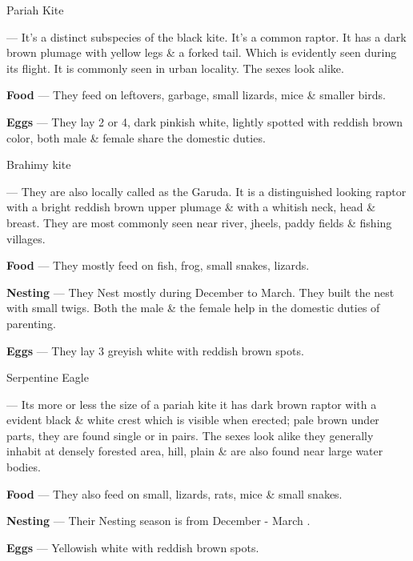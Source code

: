 \begin{bird}{Pariah Kite}

 --- It's a distinct subspecies of the black kite. It's a common raptor. It has a dark brown plumage with yellow legs \& a forked tail. Which is evidently seen during its flight. It is commonly seen in urban locality. The sexes look alike.

{\large\bf Food} --- They feed on leftovers, garbage, small lizards, mice \& smaller birds. 

{\large\bf Eggs} --- They lay 2 or 4, dark pinkish white, lightly spotted with reddish brown color, both male \& female share the domestic duties.
\end{bird}

\begin{bird}{Brahimy kite}

 --- They are also locally called as the Garuda. It is a distinguished looking raptor with a bright reddish brown upper plumage \& with a whitish neck, head \& breast. They  are most commonly seen near river, jheels, paddy fields \& fishing villages.

{\large\bf Food} --- They mostly feed on fish, frog, small snakes, lizards. 

{\large\bf Nesting} --- They Nest mostly during December to March. They built the nest with small twigs. Both  the male \& the female help in the domestic duties of parenting. 

{\large\bf Eggs} --- They lay 3 greyish white with reddish brown spots.
\end{bird}

\newpage

\begin{bird}{Serpentine Eagle}

 --- Its more or less the size of a pariah kite it has dark brown raptor with a evident black \& white crest which is visible when erected; pale brown under parts, they are found single or in pairs. The sexes look alike they generally inhabit at densely forested area, hill, plain \& are also found near large water bodies.

{\large\bf Food} --- They also feed on small, lizards, rats, mice \& small snakes. 

{\large\bf Nesting} --- Their Nesting season is from December - March . 

{\large\bf Eggs} --- Yellowish white with reddish brown spots.
\end{bird}

